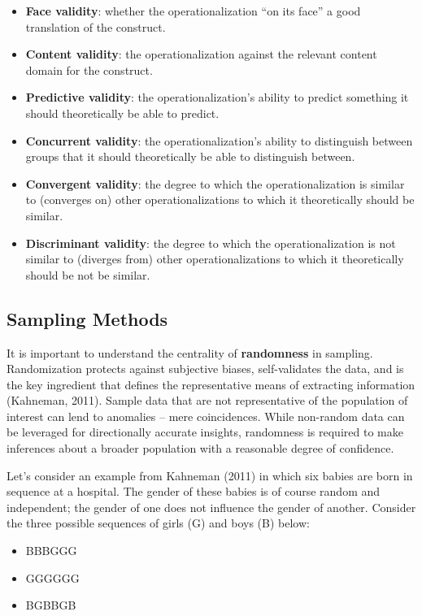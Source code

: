 \documentclass[]{book}
\providecommand{\tightlist}{%
  \setlength{\itemsep}{0pt}\setlength{\parskip}{0pt}}
\begin{document}
\begin{itemize}
\tightlist
\item
  \textbf{Face validity}: whether the operationalization ``on its face'' a good translation of the construct.
\item
  \textbf{Content validity}: the operationalization against the relevant content domain for the construct.
\item
  \textbf{Predictive validity}: the operationalization's ability to predict something it should theoretically be able to predict.
\item
  \textbf{Concurrent validity}: the operationalization's ability to distinguish between groups that it should theoretically be able to distinguish between.
\item
  \textbf{Convergent validity}: the degree to which the operationalization is similar to (converges on) other operationalizations to which it theoretically should be similar.
\item
  \textbf{Discriminant validity}: the degree to which the operationalization is not similar to (diverges from) other operationalizations to which it theoretically should be not be similar.
\end{itemize}

\hypertarget{sampling-methods}{%
\subsection{Sampling Methods}\label{sampling-methods}}

It is important to understand the centrality of \textbf{randomness} in sampling. Randomization protects against subjective biases, self-validates the data, and is the key ingredient that defines the representative means of extracting information (Kahneman, 2011). Sample data that are not representative of the population of interest can lend to anomalies -- mere coincidences. While non-random data can be leveraged for directionally accurate insights, randomness is required to make inferences about a broader population with a reasonable degree of confidence.

Let's consider an example from Kahneman (2011) in which six babies are born in sequence at a hospital. The gender of these babies is of course random and independent; the gender of one does not influence the gender of another. Consider the three possible sequences of girls (G) and boys (B) below:

\begin{itemize}
\tightlist
\item
  BBBGGG
\item
  GGGGGG
\item
  BGBBGB
\end{itemize}
\end{document}
